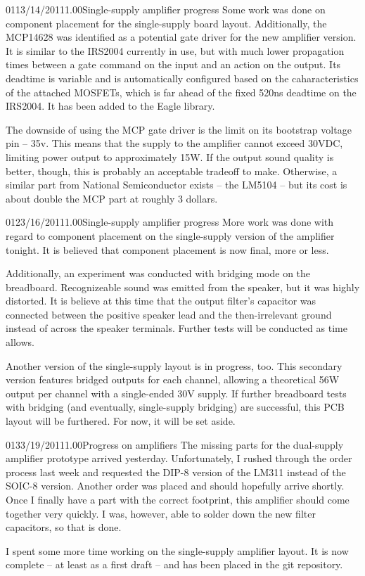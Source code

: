 \documentclass[12pt,letterpaper,onecolumn]{article}
\begin{document}
\begin{nbentry}{011}{3/14/2011}{1.00}{Single-supply amplifier progress}
Some work was done on component placement for the single-supply board layout.  Additionally, the MCP14628 was identified as a potential gate driver for the new amplifier version.  It is similar to the IRS2004 currently in use, but with much lower propagation times between a gate command on the input and an action on the output.  Its deadtime is variable and is automatically configured based on the caharacteristics of the attached MOSFETs, which is far ahead of the fixed 520ns deadtime on the IRS2004.  It has been added to the Eagle library.

The downside of using the MCP gate driver is the limit on its bootstrap voltage pin -- 35v.  This means that the supply to the amplifier cannot exceed 30VDC, limiting power output to approximately 15W.  If the output sound quality is better, though, this is probably an acceptable tradeoff to make.  Otherwise, a similar part from National Semiconductor exists -- the LM5104 -- but its cost is about double the MCP part at roughly 3 dollars.
\end{nbentry}

\begin{nbentry}{012}{3/16/2011}{1.00}{Single-supply amplifier progress}
More work was done with regard to component placement on the single-supply version of the amplifier tonight.  It is believed that component placement is now final, more or less.

Additionally, an experiment was conducted with bridging mode on the breadboard.  Recognizeable sound was emitted from the speaker, but it was highly distorted.  It is believe at this time that the output filter's capacitor was connected between the positive speaker lead and the then-irrelevant ground instead of across the speaker terminals.  Further tests will be conducted as time allows.

Another version of the single-supply layout is in progress, too.  This secondary version features bridged outputs for each channel, allowing a theoretical 56W output per channel with a single-ended 30V supply.  If further breadboard tests with bridging (and eventually, single-supply bridging) are successful, this PCB layout will be furthered.  For now, it will be set aside.
\end{nbentry}

\begin{nbentry}{013}{3/19/2011}{1.00}{Progress on amplifiers}
The missing parts for the dual-supply amplifier prototype arrived yesterday.  Unfortunately, I rushed through the order process last week and requested the DIP-8 version of the LM311 instead of the SOIC-8 version.  Another order was placed and should hopefully arrive shortly.  Once I finally have a part with the correct footprint, this amplifier should come together very quickly.  I was, however, able to solder down the new filter capacitors, so that is done.

I spent some more time working on the single-supply amplifier layout.  It is now complete -- at least as a first draft -- and has been placed in the git repository.
\end{nbentry}
\end{document}
